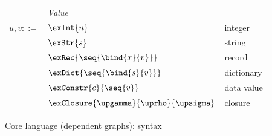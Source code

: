 \begin{figure}
   \begin{minipage}[t]{0.48\textwidth}
      \begin{tabularx}{\textwidth}{rL{2.2cm}L{3.6cm}}
          &\textit{Value}&
          \\
          $u, v ::=$
          &
          $\exInt{n}$
          &
          integer
          \\
          &
          $\exStr{s}$
          &
          string
          \\
          &
          $\exRec{\seq{\bind{x}{v}}}$
          &
          record
          \\
          &
          $\exDict{\seq{\bind{s}{v}}}$
          &
          dictionary
          \\
          &
          $\exConstr{c}{\seq{v}}$
          &
          data value
          \\
          &
          $\exClosure{\upgamma}{\uprho}{\upsigma}$
          &
          closure
          \\[0mm]
      \end{tabularx}
   \end{minipage}
\caption{Core language (dependent graphs): syntax}
\end{figure}
